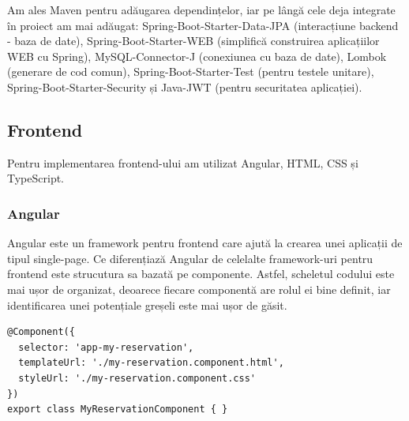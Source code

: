 Am ales Maven pentru adăugarea dependințelor, iar pe lângă cele deja integrate în proiect am mai adăugat: Spring-Boot-Starter-Data-JPA (interacțiune backend - baza de date), Spring-Boot-Starter-WEB (simplifică construirea aplicațiilor WEB cu Spring), MySQL-Connector-J (conexiunea cu baza de date), Lombok (generare de cod comun), Spring-Boot-Starter-Test (pentru testele unitare), Spring-Boot-Starter-Security și Java-JWT (pentru securitatea aplicației).

\vspace{1.5em}
\subsection{Frontend}
\hspace{1cm} Pentru implementarea frontend-ului am utilizat Angular, HTML, CSS și TypeScript.

\begin{minipage}{\textwidth}
\hfill
\begin{minipage}{0.9\textwidth}
\subsubsection{Angular}
\end{minipage}
\end{minipage}

\hspace{0cm} Angular este un framework pentru frontend care ajută la crearea unei aplicații de tipul single-page. Ce diferențiază Angular de celelalte framework-uri pentru frontend este strucutura sa bazată pe componente. Astfel, scheletul codului este mai ușor de organizat, deoarece fiecare componentă are rolul ei bine definit, iar identificarea unei potențiale greșeli este mai ușor de găsit.\cite{citation5}

\newpage

\begin{center}
\begin{minipage}{0.8\textwidth}
\captionsetup{type=listing}
   \begin{lstlisting}
@Component({
  selector: 'app-my-reservation',
  templateUrl: './my-reservation.component.html',
  styleUrl: './my-reservation.component.css'
})
export class MyReservationComponent { }
\end{lstlisting} 
\end{minipage}
\end{center}


\vspace{0.5em}


